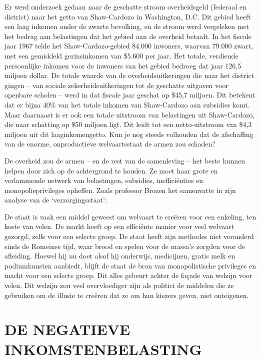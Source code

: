 \documentclass[
  a5paper,
  smalldemyvopaper,10pt,twoside,onecolumn,openright,extrafontsizes,hidelinks]{memoir}
\renewenvironment{quote}%
               {\list{}{\rightmargin=.6cm\leftmargin=.6cm}%
                \itshape \item[]}%
               {\endlist}
\begin{document}
Er werd onderzoek gedaan naar de geschatte stroom overheidsgeld
(federaal en district) naar het getto van Shaw-Cardozo in Washington,
D.C. Dit gebied heeft een laag inkomen onder de zwarte bevolking, en de
stroom werd vergeleken met het bedrag aan belastingen dat het gebied aan
de overheid betaalt. In het fiscale jaar 1967 telde het
Shaw-Cardozo-gebied 84.000 inwoners, waarvan 79.000 zwart, met een
gemiddeld gezinsinkomen van \$5.600 per jaar. Het totale, verdiende
persoonlijke inkomen voor de inwoners van het gebied bedroeg dat jaar
126,5 miljoen dollar. De totale waarde van de overheidsuitkeringen die
naar het district gingen -- van sociale zekerheidsuitkeringen tot de
geschatte uitgaven voor openbare scholen -- werd in dat fiscale jaar
geschat op \$45,7 miljoen. Dit betekent dat er bijna 40\% van het totale
inkomen van Shaw-Cardozo aan subsidies komt. Maar daarnaast is er ook
een totale uitstroom van belastingen uit Shaw-Cardozo, die naar
schatting op \$50 miljoen ligt. Dit leidt tot een netto-uitstroom van
\$4,3 miljoen uit dit laaginkomengetto. Kun je nog steeds volhouden dat
de afschaffing van de enorme, onproductieve welvaartsstaat de armen zou
schaden?

De overheid zou de armen -- en de rest van de samenleving -- het beste
kunnen helpen door zich op de achtergrond te houden. Ze moet haar grote
en verlammende netwerk van belastingen, subsidies, inefficiënties en
monopolieprivileges opheffen. Zoals professor Brozen het samenvatte in
zijn analyse van de `verzorgingsstaat':

\begin{quote}
De staat is vaak een middel geweest om welvaart te creëren voor een
enkeling, ten koste van velen. De markt heeft op een efficiënte manier
voor veel welvaart gezorgd, zelfs voor een selecte groep. De staat heeft
zijn methodes niet veranderd sinds de Romeinse tijd, waar brood en
spelen voor de massa's zorgden voor de afleiding. Hoewel hij nu doet
alsof hij onderwijs, medicijnen, gratis melk en podiumkunsten aanbiedt,
blijft de staat de bron van monopolistische privileges en macht voor een
selecte groep. Dit alles gebeurt achter de façade van welzijn voor
velen. Dit welzijn zou veel overvloediger zijn als politici de middelen
die ze gebruiken om de illusie te creëren dat ze om hun kiezers geven,
niet onteigenen.
\end{quote}

\section{DE NEGATIEVE
INKOMSTENBELASTING}\label{de-negatieve-inkomstenbelasting}
\end{document}
